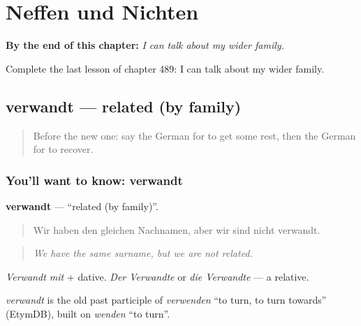 
\chapter{Neffen und Nichten}
\label{ch:ge-neffen-und-nichten}

\begin{chapteropening}
\textbf{By the end of this chapter:} \emph{I can talk about my wider family.}

Complete the last lesson of chapter 489: I can talk about my wider family.
\end{chapteropening}

\section[verwandt]{verwandt — related (by family)}

\label{lesson:GE-C489-verwandt}



\begin{quote}
Before the new one: say the German for to get some rest, then the German for to recover.
\end{quote}

\subsection*{You'll want to know: verwandt}
\textbf{verwandt} — \textquotedblleft{}related (by family)\textquotedblright{}.

\begin{quote}
Wir haben den gleichen Nachnamen, aber wir sind nicht verwandt.
\end{quote}

\begin{quote}
\emph{We have the same surname, but we are not related.}
\end{quote}

\emph{Verwandt mit} + dative. \emph{Der Verwandte} or \emph{die Verwandte} — a relative.

\begin{cousinweb}
\emph{verwandt} is the old past participle of \emph{verwenden} \textquotedblleft{}to turn, to turn towards\textquotedblright{} (EtymDB), built on \emph{wenden} \textquotedblleft{}to turn\textquotedblright{}.
\end{cousinweb}

